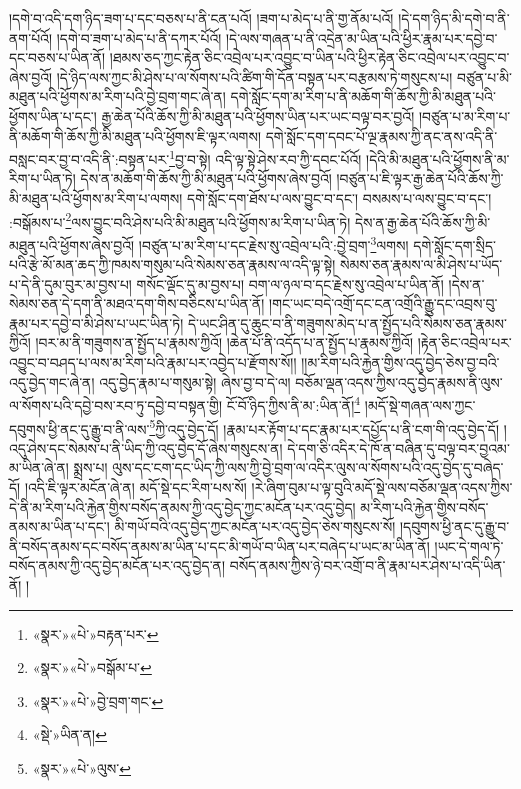 །དགེ་བ་འདི་དག་ཉིད་ཟག་པ་དང་བཅས་པ་ནི་ངན་པའོ། །ཟག་པ་མེད་པ་ནི་གྱ་ནོམ་པའོ། །དེ་དག་ཉིད་མི་དགེ་བ་ནི་ནག་པོའོ། །དགེ་བ་ཟག་པ་མེད་པ་ནི་དཀར་པོའོ། །དེ་ལས་གཞན་པ་ནི་འདྲེན་མ་ཡིན་པའི་ཕྱིར་རྣམ་པར་དབྱེ་བ་དང་བཅས་པ་ཡིན་ནོ། །ཐམས་ཅད་ཀྱང་རྟེན་ཅིང་འབྲེལ་པར་འབྱུང་བ་ཡིན་པའི་ཕྱིར་རྟེན་ཅིང་འབྲེལ་པར་འབྱུང་བ་ཞེས་བྱའོ། །དེ་ཉིད་ལས་ཀྱང་མི་ཤེས་པ་ལ་སོགས་པའི་ཚིག་གི་དོན་བསྟན་པར་བརྩམས་ཏེ་གསུངས་པ། བཙུན་པ་མི་མཐུན་པའི་ཕྱོགས་མ་རིག་པའི་བྱེ་བྲག་གང་ཞེ་ན། དགེ་སློང་དག་མ་རིག་པ་ནི་མཆོག་གི་ཆོས་ཀྱི་མི་མཐུན་པའི་ཕྱོགས་ཡིན་པ་དང་། རྒྱ་ཆེན་པོའི་ཆོས་ཀྱི་མི་མཐུན་པའི་ཕྱོགས་ཡིན་པར་ཡང་བལྟ་བར་བྱའོ། །བཙུན་པ་མ་རིག་པ་ནི་མཆོག་གི་ཆོས་ཀྱི་མི་མཐུན་པའི་ཕྱོགས་ཇི་ལྟར་ལགས། དགེ་སློང་དག་དབང་པོ་ལྔ་རྣམས་ཀྱི་ནང་ནས་འདི་ནི་བསླང་བར་བྱ་བ་འདི་ནི་:བསྟན་པར་\footnote{«སྣར་»«པེ་»བརྟན་པར་}བྱ་བ་སྟེ། འདི་ལྟ་སྟེ་ཤེས་རབ་ཀྱི་དབང་པོའོ། །དེའི་མི་མཐུན་པའི་ཕྱོགས་ནི་མ་རིག་པ་ཡིན་ཏེ། དེས་ན་མཆོག་གི་ཆོས་ཀྱི་མི་མཐུན་པའི་ཕྱོགས་ཞེས་བྱའོ། །བཙུན་པ་ཇི་ལྟར་རྒྱ་ཆེན་པོའི་ཆོས་ཀྱི་མི་མཐུན་པའི་ཕྱོགས་མ་རིག་པ་ལགས། དགེ་སློང་དག་ཐོས་པ་ལས་བྱུང་བ་དང་། བསམས་པ་ལས་བྱུང་བ་དང་། :བསྒོམས་པ་\footnote{«སྣར་»«པེ་»བསྒོམ་པ་}ལས་བྱུང་བའི་ཤེས་པའི་མི་མཐུན་པའི་ཕྱོགས་མ་རིག་པ་ཡིན་ཏེ། དེས་ན་རྒྱ་ཆེན་པོའི་ཆོས་ཀྱི་མི་མཐུན་པའི་ཕྱོགས་ཞེས་བྱའོ། །བཙུན་པ་མ་རིག་པ་དང་རྗེས་སུ་འབྲེལ་པའི་:བྱེ་བྲག་\footnote{«སྣར་»«པེ་»བྱེ་བྲག་གང་}ལགས། དགེ་སློང་དག་སྲིད་པའི་རྩེ་མོ་མན་ཆད་ཀྱི་ཁམས་གསུམ་པའི་སེམས་ཅན་རྣམས་ལ་འདི་ལྟ་སྟེ། སེམས་ཅན་རྣམས་ལ་མི་ཤེས་པ་ཡོད་པ་དེ་ནི་དུམ་བུར་མ་བྱས་པ། གསོང་ལྡོང་དུ་མ་བྱས་པ། བག་ལ་ཉལ་བ་དང་རྗེས་སུ་འབྲེལ་པ་ཡིན་ནོ། །དེས་ན་སེམས་ཅན་དེ་དག་ནི་མཐའ་དག་གིས་བཅིངས་པ་ཡིན་ནོ། །གང་ཡང་བདེ་འགྲོ་དང་ངན་འགྲོའི་རྒྱུ་དང་འབྲས་བུ་རྣམ་པར་དབྱེ་བ་མི་ཤེས་པ་ཡང་ཡིན་ཏེ། དེ་ཡང་ཤིན་དུ་ཆུང་བ་ནི་གཟུགས་མེད་པ་ན་སྤྱོད་པའི་སེམས་ཅན་རྣམས་ཀྱིའོ། །བར་མ་ནི་གཟུགས་ན་སྤྱོད་པ་རྣམས་ཀྱིའོ། །ཆེན་པོ་ནི་འདོད་པ་ན་སྤྱོད་པ་རྣམས་ཀྱིའོ། །རྟེན་ཅིང་འབྲེལ་པར་འབྱུང་བ་བཤད་པ་ལས་མ་རིག་པའི་རྣམ་པར་འབྱེད་པ་རྫོགས་སོ།། །།མ་རིག་པའི་རྐྱེན་གྱིས་འདུ་བྱེད་ཅེས་བྱ་བའི་འདུ་བྱེད་གང་ཞེ་ན། འདུ་བྱེད་རྣམ་པ་གསུམ་སྟེ། ཞེས་བྱ་བ་དེ་ལ། བཅོམ་ལྡན་འདས་ཀྱིས་འདུ་བྱེད་རྣམས་ནི་ལུས་ལ་སོགས་པའི་དབྱེ་བས་རབ་ཏུ་དབྱེ་བ་བསྟན་གྱི། ངོ་བོ་ཉིད་ཀྱིས་ནི་མ་:ཡིན་ནོ།\footnote{«སྡེ་»ཡིན་ན།} །མདོ་སྡེ་གཞན་ལས་ཀྱང་དབུགས་ཕྱི་ནང་དུ་རྒྱུ་བ་ནི་ལས་\footnote{«སྣར་»«པེ་»ལུས་}ཀྱི་འདུ་བྱེད་དོ། །རྣམ་པར་རྟོག་པ་དང་རྣམ་པར་དཔྱོད་པ་ནི་ངག་གི་འདུ་བྱེད་དོ། །འདུ་ཤེས་དང་སེམས་པ་ནི་ཡིད་ཀྱི་འདུ་བྱེད་དོ་ཞེས་གསུངས་ན། དེ་དག་ཅི་འདིར་དེ་ཁོ་ན་བཞིན་དུ་བལྟ་བར་བྱའམ་མ་ཡིན་ཞེ་ན། སྨྲས་པ། ལུས་དང་ངག་དང་ཡིད་ཀྱི་ལས་ཀྱི་བྱེ་བྲག་ལ་འདིར་ལུས་ལ་སོགས་པའི་འདུ་བྱེད་དུ་བཞེད་དོ། །འདི་ཇི་ལྟར་མངོན་ཞེ་ན། མདོ་སྡེ་དང་རིག་པས་སོ། །རེ་ཞིག་བུམ་པ་ལྟ་བུའི་མདོ་སྡེ་ལས་བཅོམ་ལྡན་འདས་ཀྱིས་དེ་ནི་མ་རིག་པའི་རྐྱེན་གྱིས་བསོད་ནམས་ཀྱི་འདུ་བྱེད་ཀྱང་མངོན་པར་འདུ་བྱེད། མ་རིག་པའི་རྐྱེན་གྱིས་བསོད་ནམས་མ་ཡིན་པ་དང་། མི་གཡོ་བའི་འདུ་བྱེད་ཀྱང་མངོན་པར་འདུ་བྱེད་ཅེས་གསུངས་སོ། །དབུགས་ཕྱི་ནང་དུ་རྒྱུ་བ་ནི་བསོད་ནམས་དང་བསོད་ནམས་མ་ཡིན་པ་དང་མི་གཡོ་བ་ཡིན་པར་བཞེད་པ་ཡང་མ་ཡིན་ནོ། །ཡང་དེ་གལ་ཏེ་བསོད་ནམས་ཀྱི་འདུ་བྱེད་མངོན་པར་འདུ་བྱེད་ན། བསོད་ནམས་ཀྱིས་ཉེ་བར་འགྲོ་བ་ནི་རྣམ་པར་ཤེས་པ་འདི་ཡིན་ནོ། །
